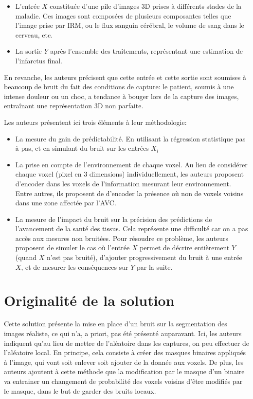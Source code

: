 \documentclass[12pt,a4paper]{article}
\begin{document}
\begin{itemize}
    \item L'entrée $X$ constituée d'une pile d'images 3D prises à différents stades de la maladie. Ces images sont composées de plusieurs composantes telles que l'image prise par IRM, ou le flux sanguin cérébral, le volume de sang dans le cerveau, etc.
    \item La sortie $Y$ après l'ensemble des traitements, représentant une estimation de l'infarctus final.
\end{itemize}

En revanche, les auteurs précisent que cette entrée et cette sortie sont soumises à beaucoup de bruit du fait des conditions de capture: le patient, soumis à une intense douleur ou un choc, a tendance à bouger lors de la capture des images, entraînant une représentation 3D non parfaite.

\medbreak

Les auteurs présentent ici trois éléments à leur méthodologie:

\begin{itemize}
    \item La mesure du gain de prédictabilité. En utilisant la régression statistique pas à pas, et en simulant du bruit sur les entrées $X_i$
    \item La prise en compte de l'environnement de chaque voxel. Au lieu de considérer chaque voxel (pixel en 3 dimensions) individuellement, les auteurs proposent d'encoder dans les voxels de l'information mesurant leur environnement. Entre autres, ils proposent de d'encoder la présence où non de voxels voisins dans une zone affectée par l'AVC.
    \item La mesure de l'impact du bruit sur la précision des prédictions de l'avancement de la santé des tissus. Cela représente une difficulté car on a pas accès aux mesures non bruitées. Pour résoudre ce problème, les auteurs proposent de simuler le cas où l'entrée $X$ permet de décrire entièrement $Y$ (quand $X$ n'est pas bruité), d'ajouter progressivement du bruit à une entrée $X$, et de mesurer les conséquences sur $Y$ par la suite.
\end{itemize}

\section{Originalité de la solution}

Cette solution présente la mise en place d'un bruit sur la segmentation des images réaliste, ce qui n'a, a priori, pas été présenté auparavant. Ici, les auteurs indiquent qu'au lieu de mettre de l'aléatoire dans les captures, on peu effectuer de l'aléatoire local. En principe, cela consiste à créer des masques binaires appliqués à l'image, qui vont soit enlever soit ajouter de la donnée aux voxels. De plus, les auteurs ajoutent à cette méthode que la modification par le masque d'un binaire va entrainer un changement de probabilité des voxels voisins d'être modifiés par le masque, dans le but de garder des bruits locaux.
\end{document}
